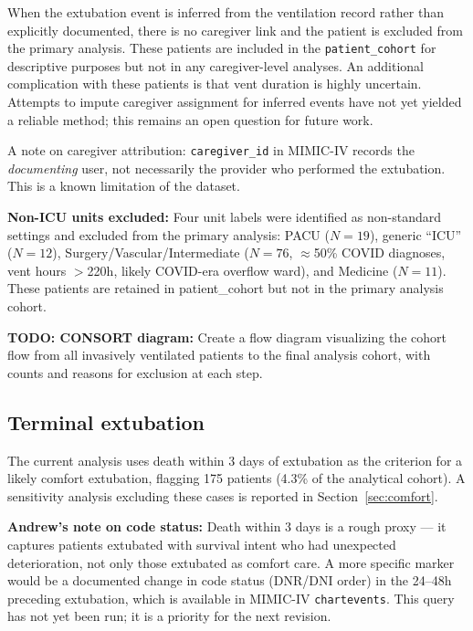 \documentclass[11pt]{article}
\begin{document}
When the extubation event is inferred from the ventilation record rather than explicitly documented, there is no caregiver link and the patient is excluded from the primary analysis. These patients are included in the \texttt{patient\_cohort} for descriptive purposes but not in any caregiver-level analyses. An additional complication with these patients is that vent duration is highly uncertain. Attempts to impute caregiver assignment for inferred events have not yet yielded a reliable method; this remains an open question for future work.

\noindent A note on caregiver attribution: \texttt{caregiver\_id} in MIMIC-IV records the \emph{documenting} user, not necessarily the provider who performed the extubation. This is a known limitation of the dataset.

\noindent \textbf{Non-ICU units excluded:} Four unit labels were identified as non-standard settings and excluded from the primary analysis: PACU ($N=19$), generic ``ICU'' ($N=12$), Surgery/Vascular/Intermediate ($N=76$, $\approx$50\% COVID diagnoses, vent hours $>$220h, likely COVID-era overflow ward), and Medicine ($N=11$). These patients are retained in patient\_cohort but not in the primary analysis cohort.

\begin{todo} 
  \textbf{TODO: CONSORT diagram:} Create a flow diagram visualizing the cohort flow from all invasively ventilated patients to the final analysis cohort, with counts and reasons for exclusion at each step.
\end{todo}

\subsection{Terminal extubation}
\label{sec:terminal}

The current analysis uses death within 3 days of extubation as the criterion for a likely comfort extubation, flagging 175 patients (4.3\% of the analytical cohort). A sensitivity analysis excluding these cases is reported in Section~\ref{sec:comfort}.

\noindent \textbf{Andrew's note on code status:} Death within 3 days is a rough proxy --- it captures patients extubated with survival intent who had unexpected deterioration, not only those extubated as comfort care. A more specific marker would be a documented change in code status (DNR/DNI order) in the 24--48h preceding extubation, which is available in MIMIC-IV \texttt{chartevents}. This query has not yet been run; it is a priority for the next revision.
\end{document}
